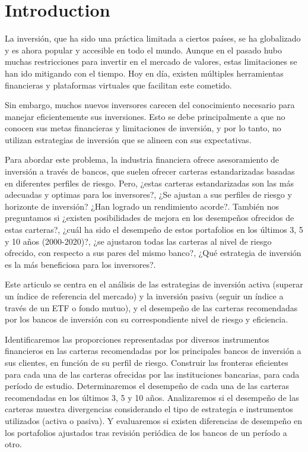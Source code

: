 \documentclass[a4paper,fleqn]{cas-sc}
\begin{document}


\section{Introduction}

La inversión, que ha sido una práctica limitada a ciertos países, se ha globalizado y es ahora popular y accesible en todo el mundo. Aunque en el pasado hubo muchas restricciones para invertir en el mercado de valores, estas limitaciones se han ido mitigando con el tiempo. Hoy en día, existen múltiples herramientas financieras y plataformas virtuales que facilitan este cometido.

Sin embargo, muchos nuevos inversores carecen del conocimiento necesario para manejar eficientemente sus inversiones. Esto se debe principalmente a que no conocen sus metas financieras y limitaciones de inversión, y por lo tanto, no utilizan estrategias de inversión que se alineen con sus expectativas.

Para abordar este problema, la industria financiera ofrece asesoramiento de inversión a través de bancos, que suelen ofrecer carteras estandarizadas basadas en diferentes perfiles de riesgo. Pero, ¿estas carteras estandarizadas son las más adecuadas y optimas para los inversores?, ¿Se ajustan a sus perfiles de riesgo y horizonte de inversión? ¿Han logrado un rendimiento acorde?. También nos preguntamos si ¿existen posibilidades de mejora en los desempeños ofrecidos de estas carteras?, ¿cuál ha sido el desempeño de estos portafolios en los últimos {\color{red}3, 5 y 10 años (2000-2020)}?, ¿se ajustaron todas las carteras al nivel de riesgo ofrecido, con respecto a sus pares del mismo banco?, ¿Qué estrategia de inversión es la más beneficiosa para los inversores?.

Este articulo se centra en el análisis de las estrategias de inversión activa (superar un índice de referencia del mercado) y la inversión pasiva (seguir un índice a través de un ETF o fondo mutuo), y el desempeño de las carteras recomendadas por los bancos de inversión con su correspondiente nivel de riesgo y eficiencia. 

Identificaremos las proporciones representadas por diversos instrumentos financieros en las carteras recomendadas por los principales bancos de inversión a sus clientes, en función de su perfil de riesgo. Construir las fronteras eficientes para cada una de las carteras ofrecidas por las instituciones bancarias, para cada período de estudio. Determinaremos el desempeño de cada una de las carteras recomendadas en los últimos 3, 5 y 10 años. Analizaremos si el desempeño de las carteras muestra divergencias considerando el tipo de estrategia e instrumentos utilizados (activa o pasiva). Y evaluaremos si existen diferencias de desempeño en los portafolios ajustados tras revisión periódica de los bancos de un período a otro.
\end{document}
